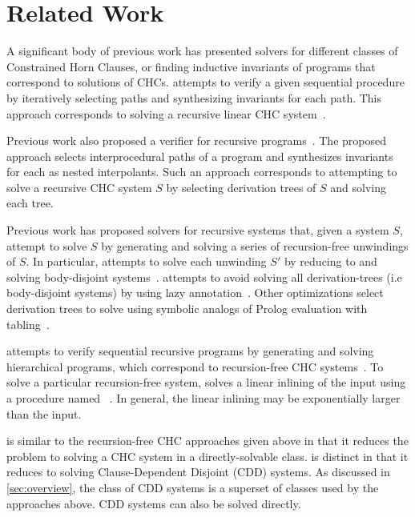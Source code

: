 \section{Related Work}
\label{sec:related-work}
A significant body of previous work has presented solvers for
different classes of Constrained Horn Clauses, or finding inductive
invariants of programs that correspond to solutions of CHCs.
\impact attempts to verify a given sequential procedure by iteratively
selecting paths and synthesizing invariants for each path. This
approach corresponds to solving a recursive linear CHC
system~\cite{mcmillan06}.

Previous work also proposed a verifier for recursive
programs~\cite{heizmann10}.
%
The proposed approach selects interprocedural paths of a program and
synthesizes invariants for each as nested interpolants.
%
Such an approach corresponds to attempting to solve a recursive CHC
system $S$ by selecting derivation trees of $S$
and solving each tree.

Previous work has proposed solvers for recursive systems that, given a
system $S$, attempt to solve $S$ by generating and
solving a series of recursion-free unwindings of $S$.
%
In particular, \eldarica attempts to solve each unwinding
$S'$ by reducing to and solving body-disjoint systems~\cite{rummer13a,rummer13b}.
%
\duality attempts to avoid solving all derivation-trees (i.e
body-disjoint systems) by using lazy annotation~\cite{bjorner13}.
%
Other optimizations select derivation trees to solve using
symbolic analogs of Prolog evaluation with
tabling~\cite{jaffar09,mcmillan14}.
%

\whale attempts to verify sequential recursive programs by generating
and solving hierarchical programs, which correspond to recursion-free CHC
systems~\cite{albarghouthi12b}.
%
To solve a particular recursion-free system, \whale solves a linear
inlining of the input using a procedure named
\vinta~\cite{albarghouthi12a}.
%
In general, the linear inlining may be exponentially larger than the
input.

\sys is similar to the recursion-free CHC approaches given above in
that it reduces the problem to solving a CHC system in a
directly-solvable class.
%
\sys is distinct in that it reduces to solving Clause-Dependent
Disjoint (CDD) systems.
%
As discussed in \autoref{sec:overview}, the class of CDD systems is a
superset of classes used by the approaches above. CDD systems can
also be solved directly.

